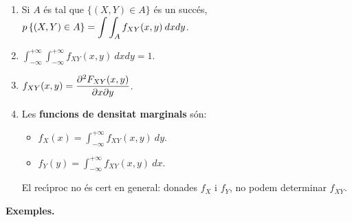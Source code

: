 \begin{enumerate}

\item Si $A$ \'es tal que $\{ (X,Y) \in A \} $ \'es un succ\'es, 
$\displaystyle p\left\{(X,Y) \in A\right\} = \int \int_A f_{XY}(x,y) \> dx dy$.

\item $\displaystyle \int_{-\infty}^{+\infty} \int_{-\infty}^{+\infty}
f_{XY}(x,y) \> dx dy = 1$.

\item $\displaystyle f_{XY}(x,y) = {\partial^2 F_{XY}(x,y) \over \partial x
\partial y}$.

\item Les {\bf funcions de densitat marginals}
s\'on:

\begin{itemize}

\item $\displaystyle f_X(x) = \int_{-\infty}^{+\infty} f_{XY}(x,y) \> dy$.

\item $\displaystyle f_Y(y) = \int_{-\infty}^{+\infty} f_{XY}(x,y) \> dx$.

\end{itemize}

El rec\'{\i}proc no \'es cert en general: donades $f_X$ i $f_Y$, no podem
determinar
$f_{XY}$.

\end{enumerate}

{\bf Exemples.}

